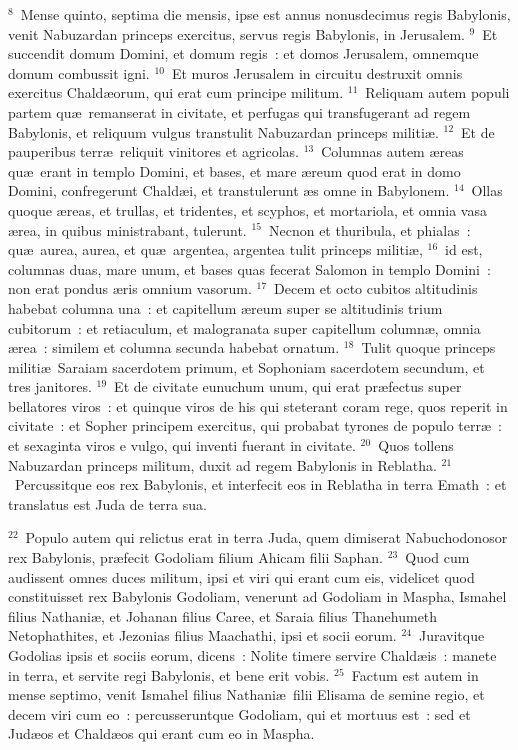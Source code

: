 ${}^{8}$~Mense quinto, septima die mensis, ipse est annus nonusdecimus regis Babylonis, venit Nabuzardan princeps exercitus, servus regis Babylonis, in Jerusalem.
${}^{9}$~Et succendit domum Domini, et domum regis~: et domos Jerusalem, omnemque domum combussit igni.
${}^{10}$~Et muros Jerusalem in circuitu destruxit omnis exercitus Chald\ae orum, qui erat cum principe militum.
${}^{11}$~Reliquam autem populi partem qu\ae\ remanserat in civitate, et perfugas qui transfugerant ad regem Babylonis, et reliquum vulgus transtulit Nabuzardan princeps militi\ae .
${}^{12}$~Et de pauperibus terr\ae\ reliquit vinitores et agricolas.
${}^{13}$~Columnas autem \ae reas qu\ae\ erant in templo Domini, et bases, et mare \ae reum quod erat in domo Domini, confregerunt Chald\ae i, et transtulerunt \ae s omne in Babylonem.
${}^{14}$~Ollas quoque \ae reas, et trullas, et tridentes, et scyphos, et mortariola, et omnia vasa \ae rea, in quibus ministrabant, tulerunt.
${}^{15}$~Necnon et thuribula, et phialas~: qu\ae\ aurea, aurea, et qu\ae\ argentea, argentea tulit princeps militi\ae ,
${}^{16}$~id est, columnas duas, mare unum, et bases quas fecerat Salomon in templo Domini~: non erat pondus \ae ris omnium vasorum.
${}^{17}$~Decem et octo cubitos altitudinis habebat columna una~: et capitellum \ae reum super se altitudinis trium cubitorum~: et retiaculum, et malogranata super capitellum column\ae , omnia \ae rea~: similem et columna secunda habebat ornatum.
${}^{18}$~Tulit quoque princeps militi\ae\ Saraiam sacerdotem primum, et Sophoniam sacerdotem secundum, et tres janitores.
${}^{19}$~Et de civitate eunuchum unum, qui erat pr\ae fectus super bellatores viros~: et quinque viros de his qui steterant coram rege, quos reperit in civitate~: et Sopher principem exercitus, qui probabat tyrones de populo terr\ae~: et sexaginta viros e vulgo, qui inventi fuerant in civitate.
${}^{20}$~Quos tollens Nabuzardan princeps militum, duxit ad regem Babylonis in Reblatha.
${}^{21}$~Percussitque eos rex Babylonis, et interfecit eos in Reblatha in terra Emath~: et translatus est Juda de terra sua.


${}^{22}$~Populo autem qui relictus erat in terra Juda, quem dimiserat Nabuchodonosor rex Babylonis, pr\ae fecit Godoliam filium Ahicam filii Saphan.
${}^{23}$~Quod cum audissent omnes duces militum, ipsi et viri qui erant cum eis, videlicet quod constituisset rex Babylonis Godoliam, venerunt ad Godoliam in Maspha, Ismahel filius Nathani\ae , et Johanan filius Caree, et Saraia filius Thanehumeth Netophathites, et Jezonias filius Maachathi, ipsi et socii eorum.
${}^{24}$~Juravitque Godolias ipsis et sociis eorum, dicens~: Nolite timere servire Chald\ae is~: manete in terra, et servite regi Babylonis, et bene erit vobis.
${}^{25}$~Factum est autem in mense septimo, venit Ismahel filius Nathani\ae\ filii Elisama de semine regio, et decem viri cum eo~: percusseruntque Godoliam, qui et mortuus est~: sed et Jud\ae os et Chald\ae os qui erant cum eo in Maspha.


